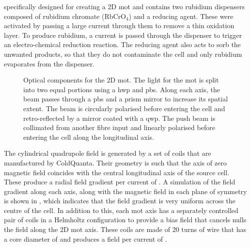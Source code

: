 specifically designed for creating a 2D\+ \ac{mot} and contains two rubidium
dispensers composed of rubidium chromate (RbCrO\(_4\)) and a reducing agent.
These were activated by passing a large current through them to remove a thin
oxidation layer. To produce rubidium, a current is passed through the dispenser
to trigger an electro-chemical reduction reaction. The reducing agent also acts
to sorb the unwanted products, so that they do not contaminate the cell and only
rubidium evaporates from the dispenser.
\begin{figure}
	\centering
	\def\svgwidth{0.5\textwidth}
	
	\caption[Optical components for the 2D \ac{mot}]{Optical components for the 2D \ac{mot}. The light for the \ac{mot} is split into two equal portions using a \ac{hwp} and \ac{pbs}. Along each axis, the beam passes through a \ac{pbs} and a prism mirror to increase its spatial extent. The beam is circularly polarised before entering the cell and retro-reflected by a mirror coated with a \ac{qwp}. The push beam is collimated from another fibre input and linearly polarised before entering the cell along the longitudinal axis.}
	\label{fig:2D_mot_optics}
\end{figure}
\par\noindent The cylindrical quadrupole field is generated by a set of coils
that are manufactured by ColdQuanta. Their geometry is such that the axis of
zero magnetic field coincides with the central longitudinal axis of the source
cell. These produce a radial field gradient per current of
. A simulation of the field
gradient along each axis, along with the magnetic field in each plane of
symmetry is shown in , which indicates that
the field gradient is very uniform across the centre of the cell. In addition to
this, each \ac{mot} axis has a separately controlled pair of coils in a
Helmholtz configuration to provide a bias field that cancels nulls the field
along the 2D \ac{mot} axis. These coils are made of 20 turns of wire that has a
core diameter of  and produces a field per current of .
